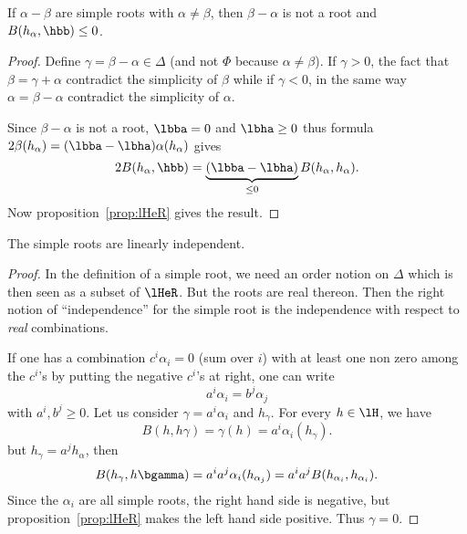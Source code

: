 \begin{lemma}
    If $\alpha-\beta$ are simple roots with $\alpha\neq\beta$, then $\beta-\alpha$ is not a root and $B( h_{\alpha},\hbb)\leq 0$.
\end{lemma}

\begin{proof}
    Define $\gamma=\beta-\alpha\in\Delta$ (and not $\Phi$ because $\alpha\neq\beta$). If $\gamma>0$, the fact that $\beta=\gamma+\alpha$ contradict the simplicity of $\beta$ while if $\gamma<0$, in the same way $\alpha=\beta-\alpha$ contradict the simplicity of $\alpha$.

    Since $\beta-\alpha$ is not a root, $\lbba=0$ and $\lbha\geq 0$ thus formula $2\beta( h_{\alpha})=(\lbba-\lbha)\alpha( h_{\alpha})$ gives
    \begin{equation}
        2B( h_{\alpha},\hbb)=\underbrace{(\lbba-\lbha)}_{\leq 0}B( h_{\alpha}, h_{\alpha}).
    \end{equation}
    Now proposition~\ref{prop:lHeR} gives the result.
\end{proof}

\begin{lemma}
    The simple roots are linearly independent.
\end{lemma}

\begin{proof}
    In the definition of a simple root, we need an order notion on $\Delta$ which is then seen as a subset of $\lHeR$. But the roots are real thereon. Then the right notion of ``independence''{} for the simple root is the independence with respect to \emph{real} combinations.

    If one has a combination $c^i\alpha_i=0$ (sum over $i$) with at least one non zero among the $c^i$'s  by putting the negative $c^i$'s at right, one can write
    \[
        a^i\alpha_i=b^j\alpha_j
    \]
    with $a^i,b^j\geq 0$. Let us consider $\gamma=a^i\alpha_i$ and $h_{\gamma}$. For every $h\in\lH$, we have
    \[
        B(h,h\gamma)=\gamma(h)=a^i\alpha_i(h_{\gamma}).
    \]
    but $h_{\gamma}=a^jh_{\alpha}$, then
    \begin{equation}
        B(h_{\gamma},h\bgamma)=a^ia^j\alpha_i(h_{\alpha_j})
                    =a^ia^jB(h_{\alpha_i},h_{\alpha_i}).
    \end{equation}
    Since the $\alpha_i$ are all simple roots, the right hand side is negative, but proposition~\ref{prop:lHeR} makes the left hand side positive. Thus $\gamma=0$.
\end{proof}

